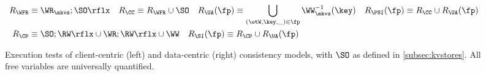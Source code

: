 \begin{figure*}[!t]
{\small
\begin{align*}
	R_{\WFR} & \equiv \WR_{\mkvs} ; \SO\rflx \quad
	R_{\CC} \equiv R_{\WFR} \cup \SO \quad
	R_{\UA}(\fp) \equiv \bigcup_{(\otW, \key, \_) \in \fp} \WW^{-1}_{\mkvs}(\key) \quad
	R_{\PSI}(\fp) \equiv R_{\CC} \cup R_{\UA}(\fp)\\
	R_{\CP} &\equiv \SO;\RW\rflx \cup \WR;\RW\rflx \cup \WW
	\quad
	R_{\SI}(\fp) \equiv R_{\CP} \cup R_{\UA}(\fp)
\end{align*}
%
%
}%
%
\hrulefill

\caption{Execution tests of client-centric (left) and data-centric (right) consistency models, 
with $\SO$ as defined in \cref{subsec:kvstores}. 
All free variables are universally quantified.
}
\label{fig:execution.tests}
\label{fig:execution_tests}
\label{fig:execution-tests}
\end{figure*}
